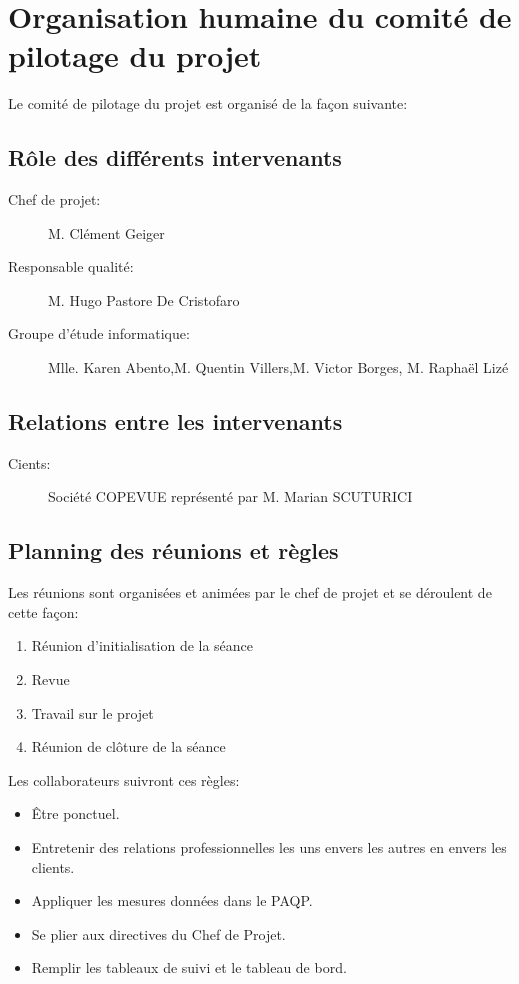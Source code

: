 
\section{Organisation humaine du comité de pilotage du projet}

    Le comité de pilotage du projet est organisé de la façon suivante:

    \subsection{Rôle des différents intervenants}
        \begin{description}
        \item[Chef de projet:]M. Clément Geiger
        \item[Responsable qualité:]M. Hugo Pastore De Cristofaro
        \item[Groupe d'étude informatique:]Mlle. Karen Abento,M. Quentin Villers,M. 
        Victor Borges, M. Raphaël Lizé
        \end{description}

    \subsection{Relations entre les intervenants}
        \begin{description}
        \item[Cients:]Société COPEVUE représenté par M. Marian SCUTURICI
        \end{description}

    \subsection{Planning des réunions et règles}
        Les réunions sont organisées et animées par le chef de projet et se
        déroulent de cette façon:
        \begin{enumerate}
        \item Réunion d'initialisation de la séance
        \item Revue
        \item Travail sur le projet
        \item Réunion de clôture de la séance
        \end{enumerate}

        Les collaborateurs suivront ces règles:
        \begin{itemize}
        \item Être ponctuel.
        \item Entretenir des relations professionnelles les uns envers les
                autres en envers les clients.
        \item Appliquer les mesures données dans le PAQP.
        \item Se plier aux directives du Chef de Projet.
        \item Remplir les tableaux de suivi et le tableau de bord.
        \end{itemize}
